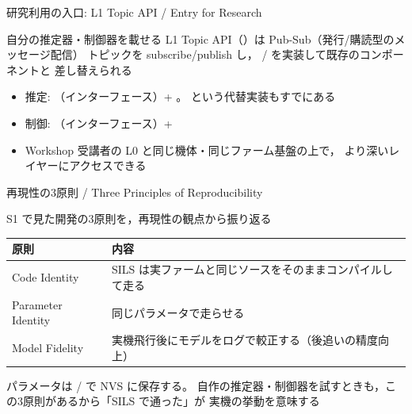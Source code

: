 \begin{frame}{研究利用の入口: L1 Topic API / Entry for Research}
  \begin{block}{自分の推定器・制御器を載せる}\small
    L1 Topic API（）は Pub-Sub（発行/購読型のメッセージ配信）
    トピックを subscribe/publish し，
    / を実装して既存のコンポーネントと
    差し替えられる
  \end{block}

  \vspace{0.5em}

  \begin{itemize}\small
    \item 推定: （インターフェース）+ 。
           という代替実装もすでにある
    \item 制御: （インターフェース）+ 
    \item Workshop 受講者の L0 と同じ機体・同じファーム基盤の上で，
          より深いレイヤーにアクセスできる
  \end{itemize}
\end{frame}

\begin{frame}{再現性の3原則 / Three Principles of Reproducibility}
  \vspace{0.3em}

  {\small S1 で見た開発の3原則を，再現性の観点から振り返る}

  \vspace{0.3em}

  \begin{table}
    \centering\small
    \begin{tabular}{lp{80mm}}
      \hline
      \textbf{原則} & \textbf{内容} \\
      \hline
      Code Identity & SILS は実ファームと同じソースをそのままコンパイルして走る \\
      Parameter Identity & 同じパラメータで走らせる \\
      Model Fidelity & 実機飛行後にモデルをログで較正する（後追いの精度向上） \\
      \hline
    \end{tabular}
  \end{table}

  \vspace{0.5em}

  {\small パラメータは / で NVS に保存する。
  自作の推定器・制御器を試すときも，この3原則があるから「SILS で通った」が
  実機の挙動を意味する}
\end{frame}

